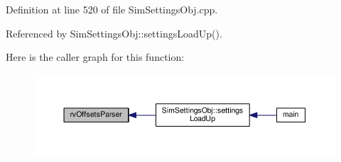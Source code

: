 Definition at line 520 of file Sim\-Settings\-Obj.\-cpp.



Referenced by Sim\-Settings\-Obj\-::settings\-Load\-Up().



Here is the caller graph for this function\-:\nopagebreak
\begin{figure}[H]
\begin{center}
\leavevmode
\includegraphics[width=350pt]{_sim_settings_obj_8cpp_a4cd9aff0afb881a95ccc930b0dd6b20f_icgraph}
\end{center}
\end{figure}


